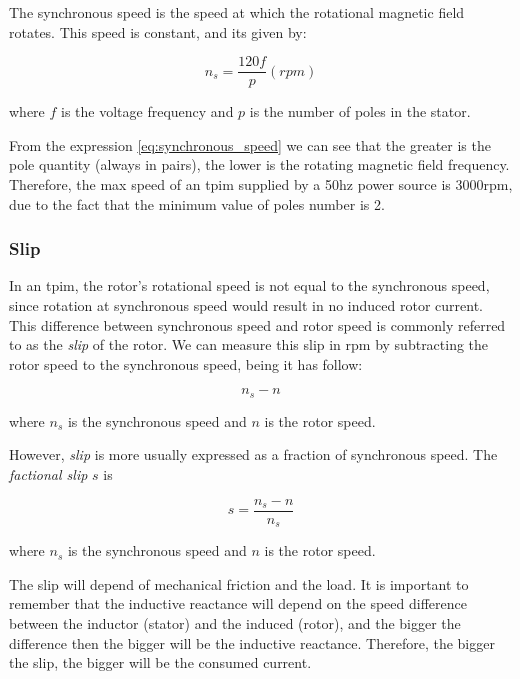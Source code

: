 The synchronous speed is the speed at which the rotational magnetic field rotates. This speed is constant, and its given by:

\begin{equation} \label{eq:synchronous_speed}
	 n_{s} = \frac{120f}{p}(rpm)
\end{equation}

\noindent where $f$ is the voltage frequency and $p$ is the number of poles in the stator.

From the expression \ref{eq:synchronous_speed} we can see that the greater is the pole quantity (always in pairs), the lower is the rotating magnetic field frequency.
Therefore, the max speed of an \acrshort{tpim} supplied by a 50hz power source is 3000rpm, due to the fact that the minimum value of poles number is 2.


\subsubsection{Slip}
In an \acrshort{tpim}, the rotor's rotational speed is not equal to the synchronous speed, since rotation at synchronous speed would result in no induced rotor current. This difference between synchronous speed and rotor speed is commonly referred to as the \emph{slip} of the rotor. We can measure this slip in rpm by subtracting the rotor speed to the synchronous speed, being it has follow:

\begin{equation} \label{eq:slip}
	 n_{s} - n
\end{equation}

\noindent where $n_{s}$ is the synchronous speed and $n$ is the rotor speed.

However, \emph{slip} is more usually expressed as a fraction of synchronous speed. The \emph{factional slip} $s$ is

\begin{equation} \label{eq:perc_slip}
	s = \frac{n_{s} - n}{n_{s}} 
\end{equation}

\noindent where $n_{s}$ is the synchronous speed and $n$ is the rotor speed.

The slip will depend of mechanical friction and the load. It is important to remember that the inductive reactance will depend on the speed difference between the inductor (stator) and the induced (rotor), and the bigger the difference then the bigger will be the inductive reactance. Therefore, the bigger the slip, the bigger will be the consumed current.

